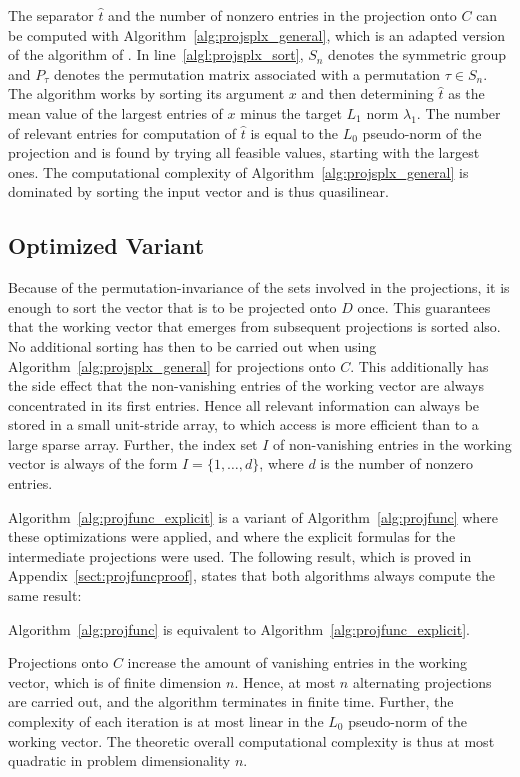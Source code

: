 \documentclass[twoside,11pt]{article}
\newcommand{\0}{\mathcal{O}}
\newcommand{\discint}[2]{\{#1,\dotsc,#2\}}
\begin{document}
The separator $\hat{t}$ and the number of nonzero entries in the projection onto $C$ can be computed with Algorithm~\ref{alg:projsplx_general}, which is an adapted version of the algorithm of \citet{Chen2011}.
In line~\ref{algl:projsplx_sort}, $S_n$ denotes the symmetric group and $P_\tau$ denotes the permutation matrix associated with a permutation $\tau\in S_n$.
The algorithm works by sorting its argument $x$ and then determining $\hat{t}$ as the mean value of the largest entries of $x$ minus the target $L_1$ norm $\lambda_1$.
The number of relevant entries for computation of $\hat{t}$ is equal to the $L_0$ pseudo-norm of the projection and is found by trying all feasible values, starting with the largest ones.
The computational complexity of Algorithm~\ref{alg:projsplx_general} is dominated by sorting the input vector and is thus quasilinear.

\subsection{Optimized Variant}
\label{sect:projfunc_optimized_variant}
Because of the permutation-invariance of the sets involved in the projections, it is enough to sort the vector that is to be projected onto $D$ once.
This guarantees that the working vector that emerges from subsequent projections is sorted also.
No additional sorting has then to be carried out when using Algorithm~\ref{alg:projsplx_general} for projections onto $C$.
This additionally has the side effect that the non-vanishing entries of the working vector are always concentrated in its first entries.
Hence all relevant information can always be stored in a small unit-stride array, to which access is more efficient than to a large sparse array.
Further, the index set $I$ of non-vanishing entries in the working vector is always of the form $I = \discint{1}{d}$, where $d$ is the number of nonzero entries.

Algorithm~\ref{alg:projfunc_explicit} is a variant of Algorithm~\ref{alg:projfunc} where these optimizations were applied, and where the explicit formulas for the intermediate projections were used.
The following result, which is proved in Appendix~\ref{sect:projfuncproof}, states that both algorithms always compute the same result:
\begin{theorem}
\label{thm:projfunc_improved}
Algorithm~\ref{alg:projfunc} is equivalent to Algorithm~\ref{alg:projfunc_explicit}.
\end{theorem}
Projections onto $C$ increase the amount of vanishing entries in the working vector, which is of finite dimension $n$.
Hence, at most $n$ alternating projections are carried out, and the algorithm terminates in finite time.
Further, the complexity of each iteration is at most linear in the $L_0$ pseudo-norm of the working vector.
The theoretic overall computational complexity is thus at most quadratic in problem dimensionality $n$.
\end{document}
